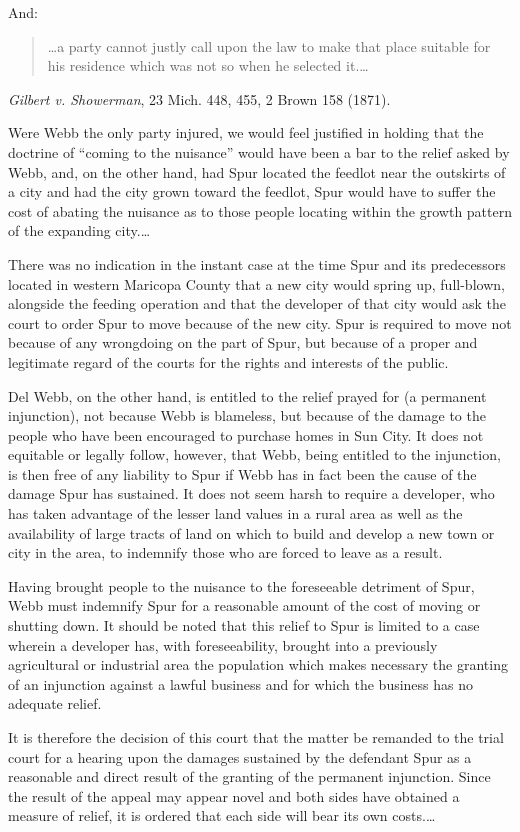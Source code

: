 And:
\begin{quote}
\ldots a party cannot justly call upon the law to make that place suitable for
his residence which was not so when he selected it.\ldots
\end{quote}
\emph{Gilbert v. Showerman}, 23 Mich. 448, 455, 2 Brown 158 (1871).

Were Webb the only party injured, we would feel justified in holding that the
doctrine of ``coming to the nuisance'' would have been a bar to the relief asked
by Webb, and, on the other hand, had Spur located the feedlot near the outskirts
of a city and had the city grown toward the feedlot, Spur would have to suffer
the cost of abating the nuisance as to those people locating within the growth
pattern of the expanding city.\ldots

There was no indication in the instant case at the time Spur and its
predecessors located in western Maricopa County that a new city would spring up,
full-blown, alongside the feeding operation and that the developer of that city
would ask the court to order Spur to move because of the new city. Spur is
required to move not because of any wrongdoing on the part of Spur, but because
of a proper and legitimate regard of the courts for the rights and interests of
the public.

Del Webb, on the other hand, is entitled to the relief prayed for (a permanent
injunction), not because Webb is blameless, but because of the damage to the
people who have been encouraged to purchase homes in Sun City. It does not
equitable or legally follow, however, that Webb, being entitled to the
injunction, is then free of any liability to Spur if Webb has in fact been the
cause of the damage Spur has sustained. It does not seem harsh to require a
developer, who has taken advantage of the lesser land values in a rural area as
well as the availability of large tracts of land on which to build and develop a
new town or city in the area, to indemnify those who are forced to leave as a
result.

Having brought people to the nuisance to the foreseeable detriment of Spur, Webb
must indemnify Spur for a reasonable amount of the cost of moving or shutting
down. It should be noted that this relief to Spur is limited to a case wherein a
developer has, with foreseeability, brought into a previously agricultural or
industrial area the population which makes necessary the granting of an
injunction against a lawful business and for which the business has no adequate
relief.

It is therefore the decision of this court that the matter be remanded to the
trial court for a hearing upon the damages sustained by the defendant Spur as a
reasonable and direct result of the granting of the permanent injunction. Since
the result of the appeal may appear novel and both sides have obtained a measure
of relief, it is ordered that each side will bear its own costs.\ldots



